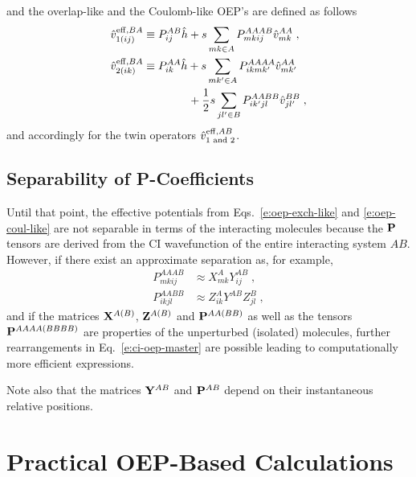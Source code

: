 %
and
the overlap\hyp{}like and the Coulomb\hyp{}like 
OEP's are defined as follows
%
\begin{subequations}
\begin{align} \label{e:oep-exch-like}
	\hat{v}^{{\rm eff},BA}_{1(ij)} &\equiv P_{ij}^{AB} \hat{h}
	+ s \sum_{mk\in A}  P^{AAAB}_{mkij} \hat{v}_{mk}^{AA} \;, \\
	\hat{v}^{{\rm eff},BA}_{2(ik)} &\equiv P_{ik}^{AA} \hat{h} 
        + s \sum_{mk'\in A} P^{AAAA}_{ikmk'} \hat{v}_{mk'}^{AA}  \nonumber
        \\ \label{e:oep-coul-like}
	& \qquad\qquad+ \frac{1}{2}
        s \sum_{jl'\in B}  P^{AABB}_{ik'jl} \hat{v}_{jl'}^{BB} \;,
\end{align}
\end{subequations}
%
and accordingly for the twin operators $\hat{v}^{{\rm eff},AB}_{\text{$1$ and $2$}}$.

\subsection{\label{s.242}Separability of P-Coefficients}

Until that point, the effective potentials from Eqs.~\eqref{e:oep-exch-like}
and \eqref{e:oep-coul-like} are not separable in terms of the interacting molecules
because the $\bf P$ tensors are derived from the CI wavefunction of
the entire interacting system $AB$. However, if there exist an approximate
separation as, for example,
%
\begin{align}
 P^{AAAB}_{mkij} &\approx X^A_{mk} Y^{AB}_{ij} \;, \\
 P^{AABB}_{ikjl} &\approx Z^A_{ik} Y^{AB}_{} Z^{ B}_{jl} \;,
\end{align}
%
and if the matrices ${\bf X}^{A(B)}$, 
${\bf Z}^{A(B)}$ and ${\bf P}^{AA(BB)}$ as well as the tensors
${\bf P}^{AAAA(BBBB)}$ 
are properties of the unperturbed (isolated) molecules,
further rearrangements in Eq.~\eqref{e:ci-oep-master} are possible
leading to computationally more efficient expressions.

Note also that the matrices ${\bf Y}^{AB}$ and ${\bf P}^{AB}$ depend on their instantaneous 
relative positions.


\section{\label{s.334}Practical OEP-Based Calculations}

